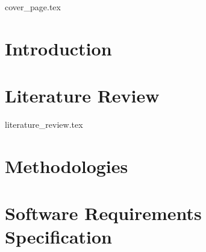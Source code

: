 \documentclass[a4paper, 12pt, oneside]{book}
\begin{document}
\frontmatter
{cover_page.tex}


{  %

\tableofcontents

{\let\clearpage\relax
\listoffigures}
{\let\clearpage\relax
\listoftables}
{\let\clearpage\relax
\printglossary[type=\acronymtype,nonumberlist, style=super
]}
}

\mainmatter


\chapter{Introduction}

\chapter{Literature Review}
{literature_review.tex}

\chapter{Methodologies}

\chapter{Software Requirements Specification}



\end{document}
